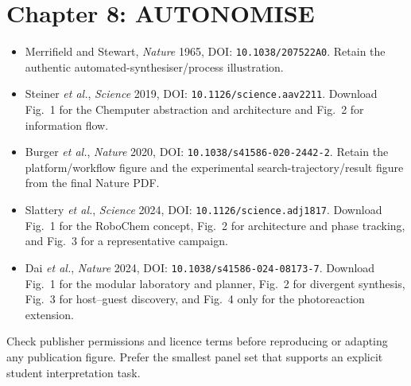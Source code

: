 \section*{Chapter 8: AUTONOMISE}

\begin{itemize}
  \item Merrifield and Stewart, \textit{Nature} 1965, DOI: \texttt{10.1038/207522A0}.
  Retain the authentic automated-synthesiser/process illustration.
  \item Steiner \textit{et al.}, \textit{Science} 2019, DOI: \texttt{10.1126/science.aav2211}.
  Download Fig.~1 for the Chemputer abstraction and architecture and Fig.~2 for information flow.
  \item Burger \textit{et al.}, \textit{Nature} 2020, DOI: \texttt{10.1038/s41586-020-2442-2}.
  Retain the platform/workflow figure and the experimental search-trajectory/result figure from the final Nature PDF.
  \item Slattery \textit{et al.}, \textit{Science} 2024, DOI: \texttt{10.1126/science.adj1817}.
  Download Fig.~1 for the RoboChem concept, Fig.~2 for architecture and phase tracking, and Fig.~3 for a representative campaign.
  \item Dai \textit{et al.}, \textit{Nature} 2024, DOI: \texttt{10.1038/s41586-024-08173-7}.
  Download Fig.~1 for the modular laboratory and planner, Fig.~2 for divergent synthesis, Fig.~3 for host--guest discovery, and Fig.~4 only for the photoreaction extension.
\end{itemize}

\begin{warningbox}
  Check publisher permissions and licence terms before reproducing or adapting any publication figure.
  Prefer the smallest panel set that supports an explicit student interpretation task.
\end{warningbox}
